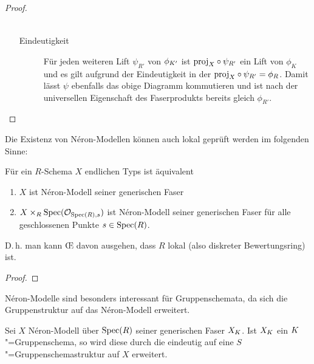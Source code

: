 \documentclass[german]{scrreprt}
\begin{document}
\begin{Satz}
\begin{proof}
\begin{enumerate}[label=(\roman*)]
\begin{description}
\begin{align*}
        \end{align*}
      \item[Eindeutigkeit]
        Für jeden weiteren Lift $\psi_{R'}$ von $\phi_{K'}$ ist
        $\text{proj}_{X}\circ\psi_{R'}$ ein Lift von $\phi_{K}$ und es gilt
        aufgrund der Eindeutigkeit in der \NAbbEig
        $\text{proj}_{X}\circ\psi_{R'}=\phi_{R}$.
        Damit lässt $\psi$ ebenfalls das obige Diagramm kommutieren
        und ist nach der universellen Eigenschaft des Faserprodukts
        bereits gleich $\phi_{R'}$.
      \end{description}
    \end{enumerate}
  \end{proof}
\end{Satz}

Die Existenz von Néron-Modellen können auch lokal geprüft werden im
folgenden Sinne:
\begin{Satz}\label{thm:neronmodelllokal}
  Für ein $R$-Schema $X$ endlichen Typs ist äquivalent
  \begin{enumerate}[label=(\roman*)]
  \item $X$ ist Néron-Modell seiner generischen Faser
  \item $X\times_R\operatorname{Spec}(\mathcal{O}_{\operatorname{Spec}(R),s})$ ist Néron-Modell seiner generischen
    Faser für alle geschlossenen Punkte $s\in\operatorname{Spec}(R)$.
  \end{enumerate}
  D.\,h. man kann \OE{} davon ausgehen, dass $R$ lokal (also diskreter
  Bewertungsring) ist.
  \cite[1.2, Proposition 3]{neron}
  \begin{proof}
  \end{proof}
\end{Satz}


Néron-Modelle sind besonders interessant für Gruppenschemata, da sich
die Gruppenstruktur auf das Néron-Modell erweitert.

\begin{Bemerkung}\label{thm:gruppenschemaerweiterung}
  Sei $X$ Néron-Modell über $\operatorname{Spec}(R)$ seiner generischen Faser
  $X_{K}$. Ist $X_{K}$ ein $K$"=Gruppenschema, so wird diese durch die
  \NAbbEig eindeutig auf eine
  $S$"=Gruppenschemastruktur auf $X$ erweitert.
  \cite[1.2, Proposition 6]{neron}
\end{Bemerkung}
\end{document}
